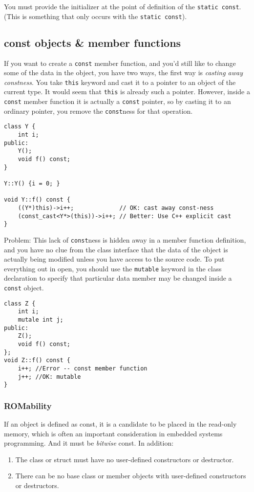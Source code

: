 \documentclass[11pt, a4paper]{book}
\begin{document}
You must provide the initializer at the point of definition of the \verb|static const|. 
(This is something that only occurs with the \verb|static const|).
\subsection{const objects \& member functions}
If you want to create a \verb|const| member function, and you'd still like to
change some of the data in the object, you have two ways, the first way is
\emph{casting away constness}. You take \verb|this| keyword and cast it to a
pointer to an object of the current type. It would seem that \verb|this| is
already such a pointer. However, inside a \verb|const| member function it is
actually a \verb|const| pointer, so by casting it to an ordinary pointer, you
remove the \verb|const|ness for that operation.

\begin{verbatim}
class Y {
    int i;
public:
    Y();
    void f() const;
}

Y::Y() {i = 0; }

void Y::f() const {
    ((Y*)this)->i++;             // OK: cast away const-ness
    (const_cast<Y*>(this))->i++; // Better: Use C++ explicit cast
}
\end{verbatim}

Problem: This lack of \verb|const|ness is hidden away in a member function
definition, and you have no clue from the class interface that the data of the
object is actually being modified unless you have access to the source code. To
put everything out in open, you should use the \verb|mutable| keyword in the
class declaration to specify that particular data member may be changed inside a
\verb|const| object. 
\begin{verbatim}
class Z {
    int i;
    mutale int j;
public:
    Z();
    void f() const;
};
void Z::f() const {
    i++; //Error -- const member function
    j++; //OK: mutable
}
\end{verbatim}
\subsubsection{ROMability}
If an object is defined as const, it is a candidate to be placed in the
read-only memory, which is often an important consideration in embedded systems
programming. And it must be \emph{bitwise} const. In addition:
\begin{enumerate}
\item The class or struct must have no user-defined constructors or destructor.
\item There can be no base class or member objects with user-defined constructors
or destructors.
\end{enumerate}
\end{document}
